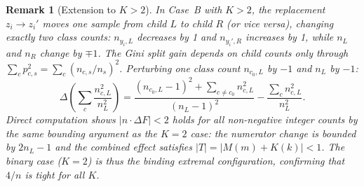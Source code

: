 \documentclass{article}
\newtheorem{remark}[theorem]{Remark}
\begin{document}
\begin{remark}[Extension to $K > 2$]\label{rem:caseb-multiclass}
In Case~B with $K > 2$, the replacement $z_i \to z_i'$ moves one
sample from child $L$ to child $R$ (or vice versa), changing exactly
two class counts: $n_{y_i, L}$ decreases by 1 and $n_{y_i', R}$
increases by 1, while $n_L$ and $n_R$ change by $\mp 1$.
The Gini split gain depends on child counts only through
$\sum_c p_{c,s}^2 = \sum_c (n_{c,s}/n_s)^2$.
Perturbing one class count $n_{c_0, L}$ by $-1$ and $n_L$ by $-1$:
\[
  \Delta\!\left(\sum_c \frac{n_{c,L}^2}{n_L^2}\right)
  = \frac{(n_{c_0,L}-1)^2 + \sum_{c \neq c_0} n_{c,L}^2}{(n_L-1)^2}
  - \frac{\sum_c n_{c,L}^2}{n_L^2}.
\]
Direct computation shows $|n \cdot \Delta F| < 2$ holds for all
non-negative integer counts by the same bounding argument as the
$K=2$ case: the numerator change is bounded by $2n_L - 1$ and the
combined effect satisfies $|T| = |M(m) + K(k)| < 1$.
The binary case ($K=2$) is thus the binding extremal configuration,
confirming that $4/n$ is tight for all $K$.
\end{remark}


% 
\end{document}
